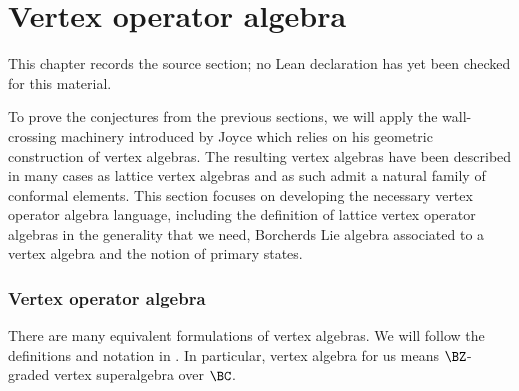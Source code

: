 \chapter{Vertex operator algebra}
\label{virasoro-constraints-moduli-sheaves-vertex-algebras-chapter-03}

\begin{remark}
\label{virasoro-constraints-moduli-sheaves-vertex-algebras-chapter-03-source}
This chapter records the source section; no Lean declaration has yet been checked for this material.
\notready
\end{remark}

To prove the conjectures from the previous sections, we will apply the wall-crossing machinery introduced by Joyce which relies on his geometric construction of vertex algebras. The resulting vertex algebras have been described in many cases as lattice vertex algebras and as such admit a natural family of conformal elements. This section focuses on developing the necessary vertex operator algebra language, including the definition of lattice vertex operator algebras in the generality that we need, Borcherds Lie algebra associated to a vertex algebra and the notion of primary states.

\subsection{Vertex operator algebra}
\label{sec: voadefinition}
 There are many equivalent formulations of vertex algebras. We will follow the definitions and notation in \cite{Ka98}. In particular, vertex algebra for us means $\BZ$-graded vertex superalgebra over $\BC$.

